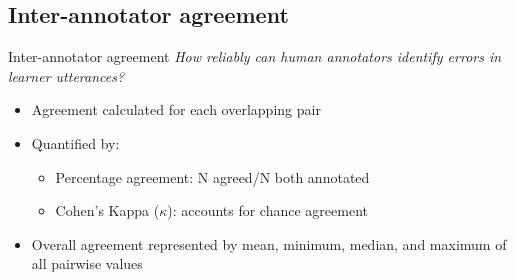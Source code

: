 \documentclass[xcolor={dvipsnames}]{beamer}
\begin{document}
	\subsection{Inter-annotator agreement}
		\begin{frame}{Inter-annotator agreement}
		\textit{How reliably can human annotators identify errors in learner utterances?}
		\vspace{1em}
		\begin{itemize}
		\item Agreement calculated for each overlapping pair
		\item Quantified by:
			\begin{itemize}
			\item Percentage agreement: N agreed/N both annotated
			\item Cohen's Kappa ($\kappa$): accounts for chance agreement
			\end{itemize}
		\item Overall agreement represented by mean, minimum, median, and maximum of all pairwise values
		\end{itemize}
		
		\end{frame}
		
\end{document}
